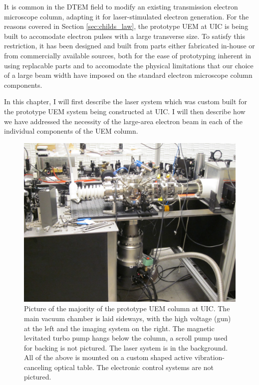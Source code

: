 
It is common in the DTEM field to modify an existing transmission electron microscope column, adapting it for laser-stimulated electron generation.
For the reasons covered in Section \ref{sec:childs_law}, the prototype UEM at UIC is being built to accomodate electron pulses with a large transverse size.
To satisfy this restriction, it has been designed and built from parts either fabricated in-house or from commercially available sources, both for the ease of prototyping inherent in using replacable parts and to accomodate the physical limitations that our choice of a large beam width have imposed on the standard electron microscope column components.

In this chapter, I will first describe the laser system which was custom built for the prototype UEM system being constructed at UIC.
I will then describe how we have addressed the necessity of the large-area electron beam in each of the individual components of the UEM column.

\begin{figure}
  \centering
  \includegraphics{inc/hardware/column.jpg}
  \caption[Picture of the prototype UEM column at UIC]{
    Picture of the majority of the prototype UEM column at UIC.
    The main vacuum chamber is laid sideways, with the high voltage (gun) at the left and the imaging system on the right.
    The magnetic levitated turbo pump hangs below the column, a scroll pump used for backing is not pictured.
    The laser system is in the background.
    All of the above is mounted on a custom shaped active vibration-canceling optical table.
    The electronic control systems are not pictured.
  }
  \label{fig:column-pic}
\end{figure}


